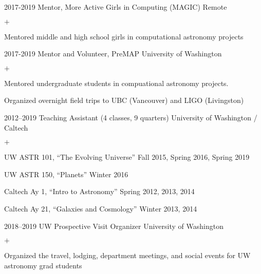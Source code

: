 \documentclass[]{luger-cv} %
\begin{document}
\begin{entrylist}


\entry
{2017-2019}
{Mentor, More Active Girls in Computing (MAGIC)}
{Remote}
{%
\vspace{-1em}
\begin{list}{$+$}{\cvlist}
\item Mentored middle and high school girls in computational astronomy projects
\end{list}
}


\entry
{2017-2019}
{Mentor and Volunteer, PreMAP}
{University of Washington}
{%
\vspace{-1em}
\begin{list}{$+$}{\cvlist}
\item Mentored undergraduate students in compuational astronomy projects.
\item Organized overnight field trips to UBC (Vancouver) and LIGO (Livingston)
\end{list}
}


\entry
{2012--2019}
{Teaching Assistant (4 classes, 9 quarters)}
{University of Washington / Caltech}
{%
\vspace{-1em}
\begin{list}{$+$}{\cvlist}
\item UW ASTR 101, ``The Evolving Universe'' \hfill {\footnotesize Fall 2015, Spring 2016, Spring 2019}
\item UW ASTR 150, ``Planets'' \hfill {\footnotesize Winter 2016}
\item Caltech Ay 1, ``Intro to Astronomy'' \hfill {\footnotesize Spring 2012, 2013, 2014}
\item Caltech Ay 21, ``Galaxies and Cosmology'' \hfill {\footnotesize Winter 2013, 2014}
\end{list}
}

\entry
{2018--2019}
{UW Prospective Visit Organizer}
{University of Washington}
{%
\vspace{-1em}
\begin{list}{$+$}{\cvlist}
\item Organized the travel, lodging, department meetings, and social events for UW astronomy grad students
\end{list}
}


\end{entrylist}
\end{document}
